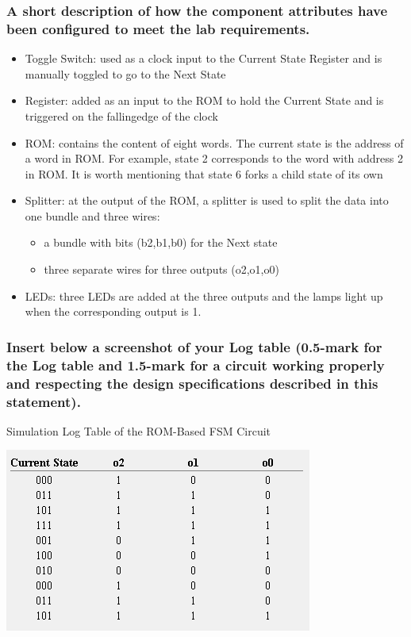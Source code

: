 \documentclass{article}
\begin{document}
		\subsubsection {A short description of how the component attributes have been configured to meet the lab requirements.}
		
		\begin{itemize}
			\item Toggle Switch: used as a clock input to the Current State Register and is manually toggled to go to the Next State
			\item Register: added as an input to the ROM to hold the Current State and is triggered on the fallingedge of the clock
			\item ROM: contains the content of eight words. The current state is the address of a word in ROM. For example, state 2 corresponds to the word with address 2 in ROM. It is worth mentioning that state 6 forks a child state of its own
			\item Splitter: at the output of the ROM, a splitter is used to split the data into one bundle and three wires:
			\begin{itemize}
				\item a bundle with bits (b2,b1,b0) for the Next state
				\item three separate wires for three outputs (o2,o1,o0)
			\end{itemize}
			\item LEDs: three LEDs are added at the three outputs and the lamps light up when the corresponding output is 1.
		\end{itemize}
		
		\pagebreak
		
		\subsubsection{Insert below a screenshot of your Log table (0.5-mark for the Log table and 1.5-mark for a circuit working properly and respecting the design specifications described in this statement).}
		\begin{table}[!ht]
			\centering
			\caption{Simulation Log Table of the ROM-Based FSM Circuit}			
			\includegraphics{sim_log_table.png}
		\end{table}				
\end{document}

